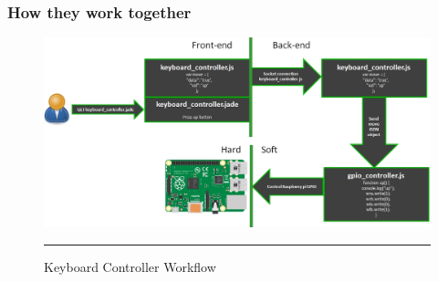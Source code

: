 \subsubsection{How they work together}
\begin{figure}[h!]
  \centering
    \includegraphics[width=1\textwidth]{./Pictures/controller_workflow.jpg}
  \rule{1\textwidth}{1pt}
 \caption{Keyboard Controller Workflow}
 \label{fig:keyboard_controller}
\end{figure}